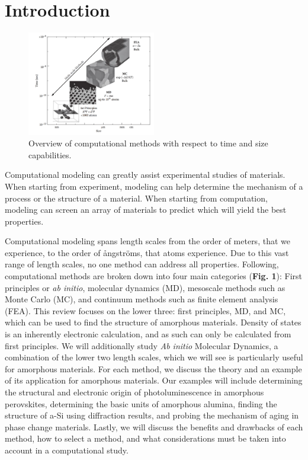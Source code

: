 \documentclass[3p,review,12pt]{elsarticle}
\begin{document}
\section{Introduction}
\begin{figure}[h]
	\includegraphics[width=0.5\textwidth]{overview}
	\centering
	\caption{Overview of computational methods with respect to time and size capabilities. \cite{Lee2012}}
\end{figure}
Computational modeling can greatly assist experimental studies of materials. When starting from experiment, modeling can help determine the mechanism of a process or the structure of a material. When starting from computation, modeling can screen an array of materials to predict which will yield the best properties.
\par
Computational modeling spans length scales from the order of meters, that we experience, to the order of \aa ngstr\"oms, that atoms experience. Due to this vast range of length scales, no one method can address all properties. Following, computational methods are broken down into four main categories (\textbf{Fig. 1}): First principles or \textit{ab initio}, molecular dynamics (MD), mesoscale methods such as Monte Carlo (MC), and continuum methods such as finite element analysis (FEA)\cite{Lee2012}. This review focuses on the lower three: first principles, MD, and MC, which can be used to find the structure of amorphous materials. Density of states is an inherently electronic calculation, and as such can only be calculated from first principles. We will additionally study \textit{Ab initio} Molecular Dynamics, a combination of the lower two length scales, which we will see is particularly useful for amorphous materials. For each method, we discuss the theory and an example of its application for amorphous materials. Our examples will include determining the structural and electronic origin of photoluminescence in amorphous perovskites, determining the basic units of amorphous alumina, finding the structure of a-Si using diffraction results, and probing the mechanism of aging in phase change materials. Lastly, we will discuss the benefits and drawbacks of each method, how to select a method,  and what considerations must be taken into  account in a computational study.
\end{document}

